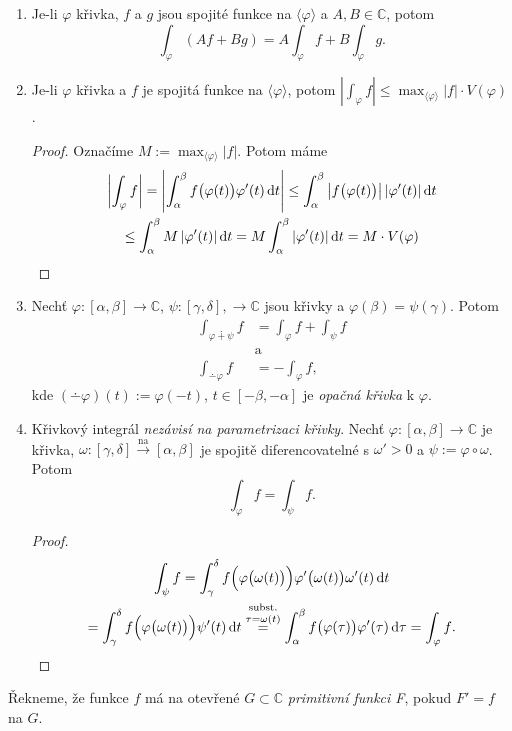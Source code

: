 \begin{propertiesBasic}
\mbox{}
\vspace{-2em}
\begin{enumerate}
    \item Je-li $\varphi$ křivka, $f$ a $g$ jsou spojité funkce na $\langle\varphi\rangle$ a $A,B \in \mathbb{C}$, potom $$\int_\varphi (Af+Bg)=A\int_\varphi f+B\int_\varphi g.$$
    \item Je-li $\varphi$ křivka a $f$ je spojitá funkce na $\langle\varphi\rangle$, potom $\left|\int_\varphi f\right|\leq\max_{\langle\varphi\rangle}|f|\cdot V(\varphi)$.
    \begin{proof}
     Označíme $M:=\max_{\langle\varphi\rangle}|f|$. Potom máme
     \begin{multline*}
     \left|\int_\varphi f\right|=
     \left| \int_\alpha^\beta f\bigl(\varphi(t)\bigr) \varphi'(t) \mathop{}\!\mathrm{d} t \right|
     \leq\int_\alpha^\beta\left|f\bigl(\varphi(t)\bigr)\right|\left|\varphi'(t)\right|\mathop{}\!\mathrm{d} t\\
     \leq\int_\alpha^\beta M\left|\varphi'(t)\right|\mathop{}\!\mathrm{d} t =M\int_\alpha^\beta \left|\varphi'(t)\right|\mathop{}\!\mathrm{d} t
     = M\cdot V(\varphi)
     \end{multline*}
    \end{proof}
    \item Nechť $\varphi:[\alpha,\beta]\rightarrow\mathbb{C}$, $\psi:[\gamma,\delta],\rightarrow\mathbb{C}$ jsou křivky a $\varphi(\beta)=\psi(\gamma)$. Potom 
    \begin{align*}
        \int_{\varphi\dotplus\psi}f&=\int_\varphi f+\int_\psi f \\ 
        &\text{a} \\
        \int_{\dotminus \varphi}f&=-\int_\varphi f\text{,}
    \end{align*}
    kde $(\dotminus \varphi)(t):=\varphi(-t)$, $t\in[-\beta,-\alpha]$ je \emph{opačná křivka} k $\varphi$.
    \item Křivkový integrál \emph{nezávisí na parametrizaci křivky}. Nechť $\varphi:[\alpha,\beta]\rightarrow\mathbb{C}$ je křivka, $\omega:[\gamma,\delta]\xrightarrow{\text{na}}[\alpha,\beta]$ je spojitě diferencovatelné s $\omega'>0$ a $\psi:=\varphi\circ\omega$. Potom $$\int_\varphi f = \int_\psi f\text{.}$$
    \begin{proof}
    \begin{multline*}
        \int_\psi f=
    \int_\gamma^\delta f\Bigl(\varphi\bigl(\omega(t)\bigr)\Bigr) \varphi'\bigl(\omega(t)\bigr)\omega'(t)\mathop{}\!\mathrm{d} t\\
    =\int_\gamma^\delta f\Bigl(\varphi\bigl(\omega(t)\bigr)\Bigr)\psi'(t)\mathop{}\!\mathrm{d} t \stackrel{\text{subst.}}{\stackrel{\tau=\omega(t)}{=}}
    \int_\alpha^\beta f\bigl(\varphi(\tau)\bigr) \varphi'(\tau)\mathop{}\!\mathrm{d} \tau=\int_\varphi f \text{.} 
    \end{multline*}
    \end{proof}
\end{enumerate}
\end{propertiesBasic}
\begin{definition}
Řekneme, že funkce $f$ má na otevřené $G\subset\mathbb{C}$ \emph{primitivní funkci F}, pokud $F'=f$ na $G$.
\end{definition}

